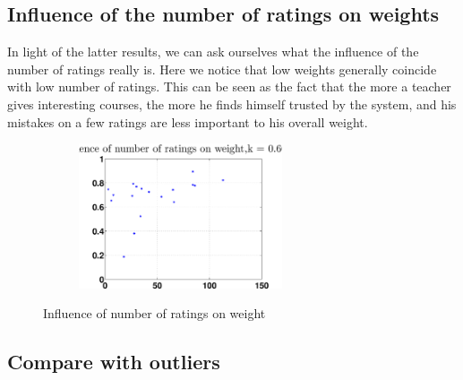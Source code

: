 \documentclass[12pt,a4paper]{article}
\begin{document}
\subsection*{Influence of the number of ratings on weights}
In light of the latter results, we can ask ourselves what the influence of the number of ratings really is. Here we notice that low weights generally coincide with low number of ratings. This can be seen as the fact that the more a teacher gives interesting courses, the more he finds himself trusted by the system, and his mistakes on a few ratings are less important to his overall weight.
\begin{figure}
\centering
\begin{subfigure}[b]{0.48\textwidth}
\includegraphics[width = 6cm]{preprocessSelect/ppsnumRatvsWK6000.eps}
\end{subfigure}

\caption{Influence of number of ratings on weight}
\end{figure}

\FloatBarrier

\subsection{Compare with outliers}



\nocite{*}
\end{document}
